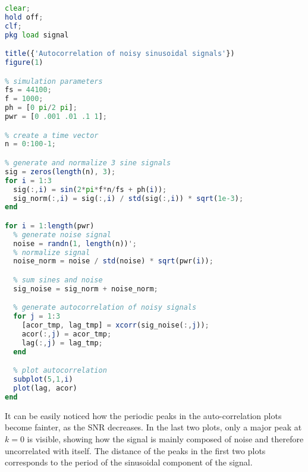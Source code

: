 \begin{lstlisting}[language=Octave]
clear;
hold off;
clf;
pkg load signal

title({'Autocorrelation of noisy sinusoidal signals'})
figure(1)

% simulation parameters
fs = 44100;
f = 1000;
ph = [0 pi/2 pi];
pwr = [0 .001 .01 .1 1];

% create a time vector
n = 0:100-1;

% generate and normalize 3 sine signals
sig = zeros(length(n), 3);
for i = 1:3
  sig(:,i) = sin(2*pi*f*n/fs + ph(i));
  sig_norm(:,i) = sig(:,i) / std(sig(:,i)) * sqrt(1e-3);
end

for i = 1:length(pwr)
  % generate noise signal
  noise = randn(1, length(n))';
  % normalize signal
  noise_norm = noise / std(noise) * sqrt(pwr(i));

  % sum sines and noise
  sig_noise = sig_norm + noise_norm;

  % generate autocorrelation of noisy signals
  for j = 1:3
    [acor_tmp, lag_tmp] = xcorr(sig_noise(:,j));
    acor(:,j) = acor_tmp;
    lag(:,j) = lag_tmp;
  end

  % plot autocorrelation
  subplot(5,1,i)
  plot(lag, acor)
end
\end{lstlisting}

It can be easily noticed how the periodic peaks in the auto-correlation plots become fainter, as the SNR decreases.
In the last two plots, only a major peak at $k=0$ is visible, showing how the signal is mainly composed of noise and therefore uncorrelated with itself.
The distance of the peaks in the first two plots corresponds to the period of the sinusoidal component of the signal.
